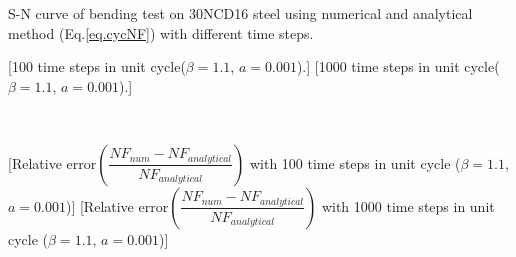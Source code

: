 \begin{Figure}[]{S-N curve of bending test on 30NCD16 steel using numerical and analytical method (Eq.\eqref{eq.cycNF}) with different time steps.}
	\centerline{
		[100 time steps in unit cycle($\beta=1.1$, $a=0.001$).]
		[1000 time steps in unit cycle($\beta=1.1$, $a=0.001$).]}
	\\
	\centerline{
		[Relative error$\left( \dfrac{NF_{num}-NF_{analytical}}{NF_{analytical}}\right)$  with 100 time steps in unit cycle  ($\beta=1.1$, $a=0.001$)]
		[Relative error$\left( \dfrac{NF_{num}-NF_{analytical}}{NF_{analytical}}\right)$  with 1000 time steps in unit cycle  ($\beta=1.1$, $a=0.001$)]}
	\label{fig.sn-num-ana}
\end{Figure}
%

